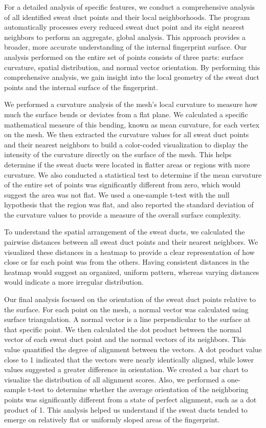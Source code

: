 For a detailed analysis of specific features, we conduct a comprehensive analysis of all identified sweat duct points and their local neighborhoods. The program automatically processes every reduced sweat duct point and its eight nearest neighbors to perform an aggregate, global analysis. This approach provides a broader, more accurate understanding of the internal fingerprint surface. Our analysis performed on the entire set of points consists of three parts: surface curvature, spatial distribution, and normal vector orientation. By performing this comprehensive analysis, we gain insight into the local geometry of the sweat duct points and the internal surface of the fingerprint.

We performed a curvature analysis of the mesh's local curvature to measure how much the surface bends or deviates from a flat plane. We calculated a specific mathematical measure of this bending, known as mean curvature, for each vertex on the mesh. We then extracted the curvature values for all sweat duct points and their nearest neighbors to build a color-coded visualization to display the intensity of the curvature directly on the surface of the mesh. This helps determine if the sweat ducts were located in flatter areas or regions with more curvature. We also conducted a statistical test to determine if the mean curvature of the entire set of points was significantly different from zero, which would suggest the area was not flat. We used a one-sample t-test with the null hypothesis that the region was flat, and also reported the standard deviation of the curvature values to provide a measure of the overall surface complexity.

To understand the spatial arrangement of the sweat ducts, we calculated the pairwise distances between all sweat duct points and their nearest neighbors. We visualized these distances in a heatmap to provide a clear representation of how close or far each point was from the others. Having consistent distances in the heatmap would suggest an organized, uniform pattern, whereas varying distances would indicate a more irregular distribution.

Our final analysis focused on the orientation of the sweat duct points relative to the surface. For each point on the mesh, a normal vector was calculated using surface triangulation. A normal vector is a line perpendicular to the surface at that specific point. We then calculated the dot product between the normal vector of each sweat duct point and the normal vectors of its neighbors. This value quantified the degree of alignment between the vectors. A dot product value close to 1 indicated that the vectors were nearly identically aligned, while lower values suggested a greater difference in orientation. We created a bar chart to visualize the distribution of all alignment scores. Also, we performed a one-sample t-test to determine whether the average orientation of the neighboring points was significantly different from a state of perfect alignment, such as a dot product of 1. This analysis helped us understand if the sweat ducts tended to emerge on relatively flat or uniformly sloped areas of the fingerprint.